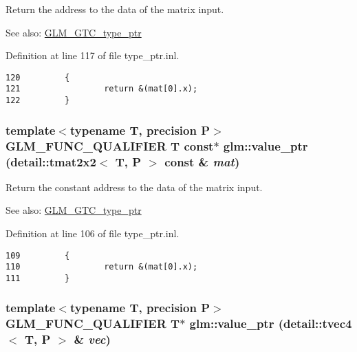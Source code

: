 Return the address to the data of the matrix input. \begin{Desc}
\item[See also:]\hyperlink{group__gtc__type__ptr}{GLM\_\-GTC\_\-type\_\-ptr} \end{Desc}


Definition at line 117 of file type\_\-ptr.inl.

\begin{Code}\begin{verbatim}120         {
121                 return &(mat[0].x);
122         }
\end{verbatim}
\end{Code}


\hypertarget{group__gtc__type__ptr_g97a60e78c46993259f0cbac724d0b354}{
\subsubsection[value\_\-ptr]{\setlength{\rightskip}{0pt plus 5cm}template$<$typename T, precision P$>$ GLM\_\-FUNC\_\-QUALIFIER T const$\ast$ glm::value\_\-ptr (detail::tmat2x2$<$ T, P $>$ const \& {\em mat})}}
\label{group__gtc__type__ptr_g97a60e78c46993259f0cbac724d0b354}


Return the constant address to the data of the matrix input. \begin{Desc}
\item[See also:]\hyperlink{group__gtc__type__ptr}{GLM\_\-GTC\_\-type\_\-ptr} \end{Desc}


Definition at line 106 of file type\_\-ptr.inl.

\begin{Code}\begin{verbatim}109         {
110                 return &(mat[0].x);
111         }
\end{verbatim}
\end{Code}


\hypertarget{group__gtc__type__ptr_g793e108db1bc068a8c09cf75c1b04389}{
\subsubsection[value\_\-ptr]{\setlength{\rightskip}{0pt plus 5cm}template$<$typename T, precision P$>$ GLM\_\-FUNC\_\-QUALIFIER T$\ast$ glm::value\_\-ptr (detail::tvec4$<$ T, P $>$ \& {\em vec})}}
\label{group__gtc__type__ptr_g793e108db1bc068a8c09cf75c1b04389}


